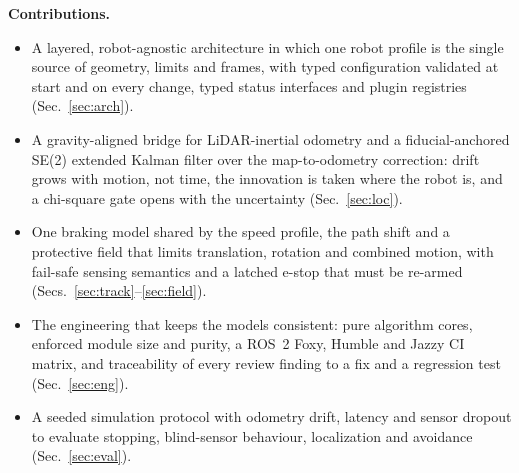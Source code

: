\textbf{Contributions.}
\begin{itemize}
  \item A layered, robot-agnostic architecture in which one robot profile is the single source
    of geometry, limits and frames, with typed configuration validated at start and on every
    change, typed status interfaces and plugin registries (Sec.~\ref{sec:arch}).
  \item A gravity-aligned bridge for LiDAR-inertial odometry and a fiducial-anchored SE(2)
    extended Kalman filter over the map-to-odometry correction: drift grows with motion, not
    time, the innovation is taken where the robot is, and a chi-square gate opens with the
    uncertainty (Sec.~\ref{sec:loc}).
  \item One braking model shared by the speed profile, the path shift and a protective field
    that limits translation, rotation and combined motion, with fail-safe sensing semantics and
    a latched e-stop that must be re-armed (Secs.~\ref{sec:track}--\ref{sec:field}).
  \item The engineering that keeps the models consistent: pure algorithm cores, enforced module
    size and purity, a ROS~2 Foxy, Humble and Jazzy CI matrix, and traceability of every review
    finding to a fix and a regression test (Sec.~\ref{sec:eng}).
  \item A seeded simulation protocol with odometry drift, latency and sensor dropout to evaluate
    stopping, blind-sensor behaviour, localization and avoidance (Sec.~\ref{sec:eval}).
\end{itemize}
